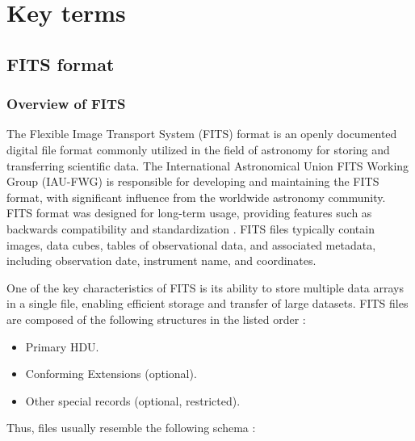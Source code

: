 \documentclass[licencjacka,en]{pracamgr}
\begin{document}
\chapter{Key terms}\label{r:definitions}

\section{FITS format}

\subsection{Overview of FITS}

The Flexible Image Transport System (FITS) format is an openly documented digital file format commonly utilized in the field of astronomy for storing and transferring scientific data. The International Astronomical Union FITS Working Group (IAU-FWG) \cite{fits-working-group}is responsible for developing and maintaining the FITS format, with significant influence from the worldwide astronomy community. FITS format was designed for long-term usage, providing features such as backwards compatibility and standardization \cite{fits-standard}. FITS files typically contain images, data cubes, tables of observational data, and associated metadata, including observation date, instrument name, and coordinates.

One of the key characteristics of FITS is its ability to store multiple data arrays in a single file, enabling efficient storage and transfer of large datasets. FITS files are composed of the following structures in the listed order \cite{fits-official}:
\begin{itemize}
\item Primary HDU.
\item Conforming Extensions (optional).
\item Other special records (optional, restricted).
\end{itemize}

Thus, files usually resemble the following schema \cite{fits-image}:
\end{document}
